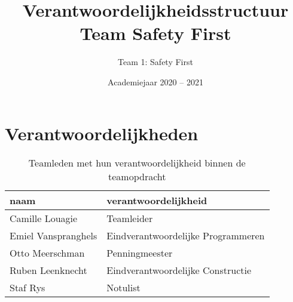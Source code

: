 \documentclass[a4paper,kulak]{kulakarticle} %
\date{Academiejaar 2020 -- 2021}
\title{Verantwoordelijkheidsstructuur Team Safety First}
\author{Team 1: Safety First}
\begin{document}
\maketitle
\section*{Verantwoordelijkheden}

\begin{table}[h]
	\caption{Teamleden met hun verantwoordelijkheid binnen de teamopdracht}
	\centering
	\begin{tabular}{l|l}
		naam                &               verantwoordelijkheid \\ 
		\hline
		Camille Louagie     &                         Teamleider \\
		Emiel Vanspranghels & Eindverantwoordelijke Programmeren \\
		Otto Meerschman     &                     Penningmeester \\
		Ruben Leenknecht    &  Eindverantwoordelijke Constructie \\
		Staf Rys            &                           Notulist \\
	\end{tabular}

\end{table}
\end{document}
